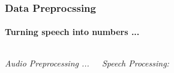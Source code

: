\documentclass[10pt,usepdftitle=false,aspectratio=169]{beamer}
\begin{document}
\begin{frame}\frametitle{Data Preprocssing}
    \framesubtitle{Turning speech into numbers ...}
	\begin{columns}
	
	
	
		\emph{Audio Preprocessing ...}
		
	
		
		
		
		
		
	
		\emph{Speech Processing:}
		
		
		
	
		\end{columns}
	\end{frame}




	
	

	

	
\end{document}
